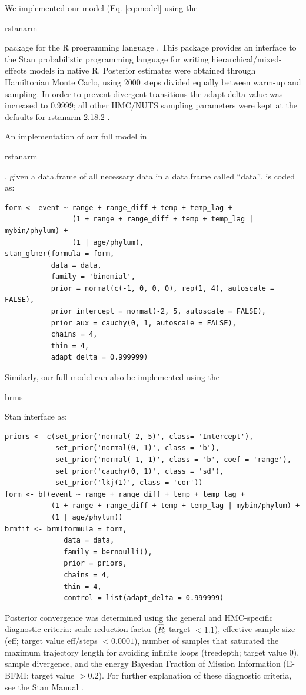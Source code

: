 \documentclass[12pt,letterpaper]{article}
\begin{document}
We implemented our model (Eq. \ref{eq:model} using the \begin{texttt}rstanarm\end{texttt} package for the R programming language \citep{StanManual}. This package provides an interface to the Stan probabilistic programming language for writing hierarchical/mixed-effects models in native R. Posterior estimates were obtained through Hamiltonian Monte Carlo, using 2000 steps divided equally between warm-up and sampling. In order to prevent divergent transitions the adapt delta value was increased to 0.9999; all other HMC/NUTS sampling parameters were kept at the defaults for rstanarm 2.18.2 \citep{rstanarm}.

An implementation of our full model in \begin{texttt}rstanarm\end{texttt}, given a data.frame of all necessary data in a data.frame called ``data'', is coded as:
\begin{verbatim}
form <- event ~ range + range_diff + temp + temp_lag + 
                (1 + range + range_diff + temp + temp_lag | mybin/phylum) + 
                (1 | age/phylum), 
stan_glmer(formula = form,
           data = data, 
           family = 'binomial',
           prior = normal(c(-1, 0, 0, 0), rep(1, 4), autoscale = FALSE), 
           prior_intercept = normal(-2, 5, autoscale = FALSE), 
           prior_aux = cauchy(0, 1, autoscale = FALSE), 
           chains = 4,
           thin = 4,
           adapt_delta = 0.999999)
\end{verbatim}

Similarly, our full model can also be implemented using the \begin{texttt}brms\end{texttt} Stan interface \citep{brms2017,brms2018} as:
\begin{verbatim}
priors <- c(set_prior('normal(-2, 5)', class= 'Intercept'),
            set_prior('normal(0, 1)', class = 'b'),
            set_prior('normal(-1, 1)', class = 'b', coef = 'range'),
            set_prior('cauchy(0, 1)', class = 'sd'),
            set_prior('lkj(1)', class = 'cor'))
form <- bf(event ~ range + range_diff + temp + temp_lag +
           (1 + range + range_diff + temp + temp_lag | mybin/phylum) +
           (1 | age/phylum))
brmfit <- brm(formula = form,
              data = data, 
              family = bernoulli(), 
              prior = priors,
              chains = 4, 
              thin = 4,
              control = list(adapt_delta = 0.999999)
\end{verbatim}

Posterior convergence was determined using the general and HMC-specific diagnostic criteria: scale reduction factor (\(\hat{R}\); target \(<1.1\)), effective sample size (eff; target value eff/steps \(<0.0001\)), number of samples that saturated the maximum trajectory length for avoiding infinite loops (treedepth; target value 0), sample divergence, and the energy Bayesian Fraction of Mission Information (E-BFMI; target value \(>0.2\)). For further explanation of these diagnostic criteria, see the Stan Manual \citep{StanManual}.
\end{document}
